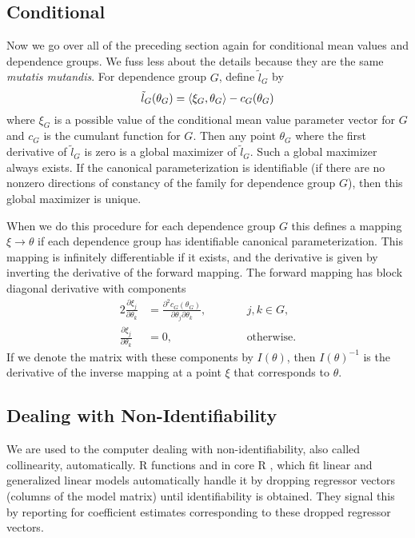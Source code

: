 \subsection{Conditional}

Now we go over all of the preceding section again
for conditional mean values and
dependence groups.  We fuss less about the details because they are the
same \emph{mutatis mutandis}.
For dependence group $G$, define $\tilde{l}_G$ by
\begin{equation} \label{eq:logl-aster-expected-g}
   \tilde{l}_G(\theta_G) = \langle \xi_G, \theta_G \rangle - c_G(\theta_G)
\end{equation}
where $\xi_G$ is a possible value of the conditional mean value parameter
vector for $G$ and $c_G$ is the cumulant function for $G$.
Then any point $\theta_G$
where the first derivative of $\tilde{l}_G$ is zero is a global maximizer
of $\tilde{l}_G$.  Such a global maximizer always exists.
If the canonical parameterization is identifiable (if there are
no nonzero directions of constancy of the family for dependence group $G$),
then this global maximizer is unique.

When we do this procedure for each dependence group $G$ this defines
a mapping $\xi \to \theta$ if each dependence group has identifiable
canonical parameterization.  This mapping is infinitely differentiable
if it exists, and the derivative is given by inverting the derivative
of the forward mapping.  The forward mapping has block diagonal derivative
with components
\begin{alignat*}{2}
   \frac{\partial \xi_j}{\partial \theta_k}
   & =
   \frac{\partial^2 c_G(\theta_G)}{\partial \theta_j \partial \theta_k},
   & \qquad & j, k \in G,
   \\
   \frac{\partial \xi_j}{\partial \theta_k}
   & =
   0, & & \text{otherwise}.
\end{alignat*}
If we denote the matrix with these components by $I(\theta)$, then
$I(\theta)^{-1}$ is the derivative of the inverse mapping at a point
$\xi$ that corresponds to $\theta$.

\subsection{Dealing with Non-Identifiability}
\label{sec:dealing}

We are used to the computer dealing with non-identifiability, also called
collinearity, automatically.  R functions  and  in core R
\citep{r-core}, which fit linear and generalized linear models automatically
handle it by dropping regressor vectors (columns of the model matrix) until
identifiability is obtained.  They signal this by reporting  for
coefficient estimates corresponding to these dropped regressor vectors.

